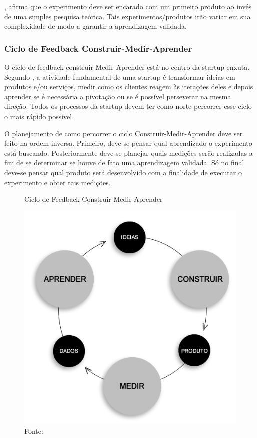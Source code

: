 , afirma que o experimento deve ser encarado com um primeiro produto ao invés de uma simples pesquisa teórica. Tais experimentos/produtos irão variar em sua complexidade de modo a garantir a aprendizagem validada.

\subsubsection{Ciclo de Feedback Construir-Medir-Aprender}
\label{cha:ciclo_cma}

O ciclo de feedback construir-Medir-Aprender está no centro da startup enxuta. Segundo , a atividade fundamental de uma startup é transformar ideias em produtos e/ou serviços, medir como os clientes reagem às iterações deles e depois aprender se é necessária a pivotação ou se é possível perseverar na mesma direção. Todos os processos da startup devem ter como norte percorrer esse ciclo o mais rápido possível.

O planejamento de como percorrer o ciclo Construir-Medir-Aprender deve ser feito na ordem inversa. Primeiro, deve-se pensar qual aprendizado o experimento está buscando. Posteriormente deve-se planejar quais medições serão realizadas a fim de se determinar se houve de fato uma aprendizagem validada. Só no final deve-se pensar qual produto será desenvolvido com a finalidade de executar o experimento e obter tais medições. \cite{leanstartup}

\begin{figure}[H]
\caption{Ciclo de Feedback Construir-Medir-Aprender}
\centerline{\includegraphics[scale=0.5]{img/ciclo_construir_medir_aprender}}
\label{fig:ciclo_construir_medir_aprender}
\caption* {Fonte: }
\end{figure}

